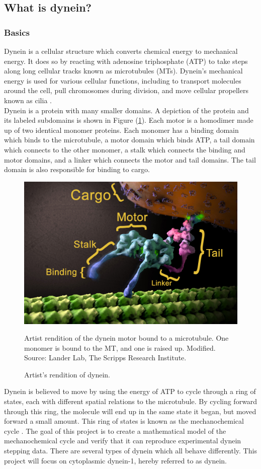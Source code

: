 \documentclass[10pt]{article} %
\begin{document}
\subsection{What is dynein?}
\subsubsection{Basics}
Dynein is a cellular structure which converts chemical energy to mechanical energy. It does so by reacting with adenosine triphosphate (ATP) to take steps along long cellular tracks known as microtubules (MTs). Dynein's mechanical energy is used for various cellular functions, including to transport molecules around the cell, pull chromosomes during division, and move cellular propellers known as cilia \cite{cianfroccoreview}.\\

Dynein is a protein with many smaller domains. A depiction of the protein and its labeled subdomains is shown in Figure (\ref{dynein-artist-rendition}). Each motor is a homodimer made up of two identical monomer proteins. Each monomer has a binding domain which binds to the microtubule, a motor domain which binds ATP, a tail domain which connects to the other monomer, a stalk which connects the binding and motor domains, and a linker which connects the motor and tail domains. The tail domain is also responsible for binding to cargo.\\

\begin{figure}[h]
  \centering
  \includegraphics[width=.65\textwidth,keepaspectratio]{../../figures/dynein-artist-rendition.jpg}
  \caption{Artist's rendition of dynein.}{Artist rendition of the dynein motor bound to a microtubule. One monomer is bound to the MT, and one is raised up. Modified. Source: Lander Lab, The Scripps Research Institute.}
  \label{dynein-artist-rendition}
\end{figure}

Dynein is believed to move by using the energy of ATP to cycle through a ring of states, each with different spatial relations to the microtubule. By cycling forward through this ring, the molecule will end up in the same state it began, but moved forward a small amount. This ring of states is known as the mechanochemical cycle \cite{cianfroccoreview}. The goal of this project is to create a mathematical model of the mechanochemical cycle and verify that it can reproduce experimental dynein stepping data. There are several types of dynein which all behave differently. This project will focus on cytoplasmic dynein-1, hereby referred to as dynein.\\
\end{document}
